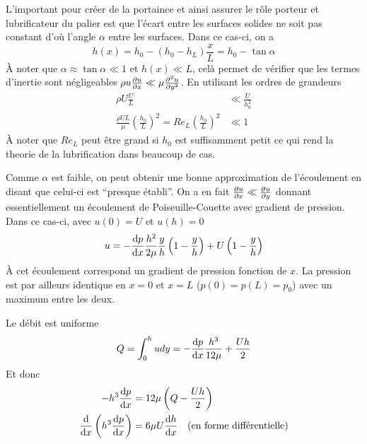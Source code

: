     L'important pour créer de la portaince et ainsi assurer le rôle porteur et lubrificateur du palier est que l'écart entre les surfaces solides ne soit pas constant d'où l'angle $\alpha$ entre les surfaces. Dans ce cas-ci, on a
    \begin{equation}
      h(x) = h_0 - (h_0 - h_L) \frac{x}{L} = h_0 - \tan \alpha
    \end{equation}
    À noter que $\alpha \approx \tan \alpha \ll 1$ et $h(x) \ll L$, celà permet de vérifier que les termes d'inertie sont négligeables $\rho u \pdv{u}{x} \ll \mu \pdv[2]{u}{y}$. En utilisant les ordres de grandeurs
    \begin{equation}
      \begin{aligned}
        \rho U \frac{U}{L} &\ll \frac{U}{h^2_0}\\
        \frac{\rho U L}{\mu} \left(\frac{h_0}{L}\right)^2 = Re_L \left(\frac{h_0}{L}\right)^2 &\ll 1
      \end{aligned}
    \end{equation}
    À noter que $Re_L$ peut être grand si $h_0$ est suffisamment petit ce qui rend la theorie de la lubrification dans beaucoup de cas.

    Comme $\alpha$ est faible, on peut obtenir une bonne approximation de l'écoulement en disant que celui-ci est ``presque établi''. On a en fait $\pdv{u}{x} \ll \pdv{u}{y}$ donnant essentiellement un écoulement de Poiseuille-Couette avec gradient de pression. Dans ce cas-ci, avec $u(0) = U$ et $u(h) = 0$
    \begin{equation}
      u = -\dv{p}{x} \frac{h^2}{2\mu} \frac{y}{h} \left(1 - \frac{y}{h}\right) + U \left(1-\frac{y}{h}\right)
    \end{equation}
    À cet écoulement correspond un gradient de pression fonction de $x$. La pression est par ailleurs identique en $x = 0$ et $x=L$  ($p(0) = p(L) = p_0$) avec un maximum entre les deux.

    Le débit est uniforme
    \begin{equation}
      Q = \int_0^h u dy = - \dv{p}{x} \frac{h^3}{12\mu} + \frac{Uh}{2}
    \end{equation}
    Et donc
    \begin{equation}
      \begin{aligned}
        -h^3 \dv{p}{x} &= 12 \mu \left(Q - \frac{Uh}{2}\right)\\
        \dv{x}\left(h^3 \dv{p}{x}\right) &= 6 \mu U \dv{h}{x} \quad \textrm{(en forme différentielle)}
      \end{aligned}
    \end{equation}


